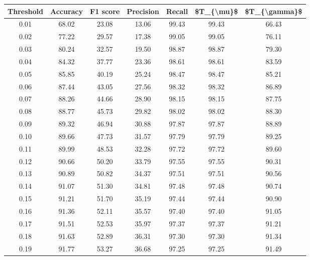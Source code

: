 \begin{tabular}{|c|c|c|c|c|c|c|}
\toprule
 Threshold &  Accuracy &  F1 score &  Precision &  Recall &  \$T\_\{\textbackslash mu\}\$ &  \$T\_\{\textbackslash gamma\}\$ \\
\hline
      0.01 &     68.02 &     23.08 &      13.06 &   99.43 &      99.43 &         66.43 \\
      0.02 &     77.22 &     29.57 &      17.38 &   99.05 &      99.05 &         76.11 \\
      0.03 &     80.24 &     32.57 &      19.50 &   98.87 &      98.87 &         79.30 \\
      0.04 &     84.32 &     37.77 &      23.36 &   98.61 &      98.61 &         83.59 \\
      0.05 &     85.85 &     40.19 &      25.24 &   98.47 &      98.47 &         85.21 \\
      0.06 &     87.44 &     43.05 &      27.56 &   98.32 &      98.32 &         86.89 \\
      0.07 &     88.26 &     44.66 &      28.90 &   98.15 &      98.15 &         87.75 \\
      0.08 &     88.77 &     45.73 &      29.82 &   98.02 &      98.02 &         88.30 \\
      0.09 &     89.32 &     46.94 &      30.88 &   97.87 &      97.87 &         88.89 \\
      0.10 &     89.66 &     47.73 &      31.57 &   97.79 &      97.79 &         89.25 \\
      0.11 &     89.99 &     48.53 &      32.28 &   97.72 &      97.72 &         89.60 \\
      0.12 &     90.66 &     50.20 &      33.79 &   97.55 &      97.55 &         90.31 \\
      0.13 &     90.89 &     50.82 &      34.37 &   97.51 &      97.51 &         90.56 \\
      0.14 &     91.07 &     51.30 &      34.81 &   97.48 &      97.48 &         90.74 \\
      0.15 &     91.21 &     51.70 &      35.19 &   97.44 &      97.44 &         90.90 \\
      0.16 &     91.36 &     52.11 &      35.57 &   97.40 &      97.40 &         91.05 \\
      0.17 &     91.51 &     52.53 &      35.97 &   97.37 &      97.37 &         91.21 \\
      0.18 &     91.63 &     52.89 &      36.31 &   97.30 &      97.30 &         91.34 \\
      0.19 &     91.77 &     53.27 &      36.68 &   97.25 &      97.25 &         91.49 \\

\end{tabular}
